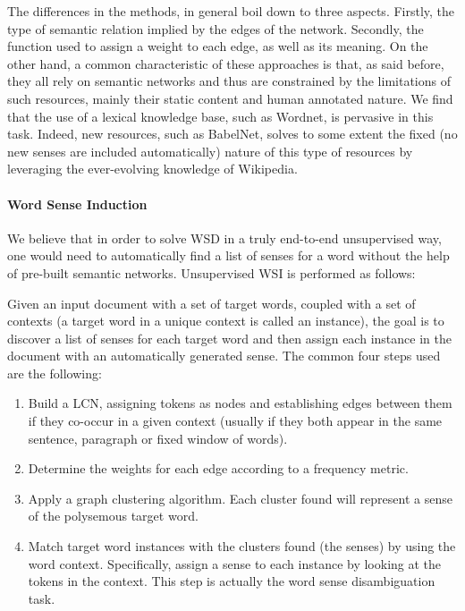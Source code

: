 The differences in the methods, in general boil down to three aspects. Firstly, the type of semantic relation implied by the edges of the network. Secondly, the function used to  assign a weight to each edge, as well as its meaning. On the other hand, a common characteristic of these approaches is that, as said before, they all rely on semantic networks and thus are constrained by the limitations of such resources, mainly their static content and human annotated nature. We find that the use of a lexical knowledge base, such as Wordnet, is pervasive in this task. Indeed, new resources, such as BabelNet, solves to some extent the fixed (no new senses are included automatically) nature of this type of resources by leveraging the ever-evolving knowledge of Wikipedia. 

\paragraph{Word Sense Induction}We believe that in order to solve WSD in a truly end-to-end unsupervised way, one would need to automatically find a list of senses for a word without the help of pre-built semantic networks. 
Unsupervised WSI is performed as follows:

Given an input document with a set of target words, coupled with a set of contexts (a target word in a unique context is called an instance), the goal is to discover a list of senses for each target word and then assign each instance in the document with an automatically generated sense. The common four steps used are the following:

\begin{enumerate}
\item Build a LCN, assigning tokens as nodes and  establishing edges between them if they co-occur in a given context (usually if they both appear in the same sentence, paragraph or fixed window of words).
\item Determine the weights for each edge according to a frequency metric. 
\item Apply a graph clustering algorithm. Each cluster found will represent a sense of the polysemous target word.
\item Match target word instances with the clusters found (the senses) by using the word context. Specifically, assign a sense to each instance by looking at the tokens in the context. This step is actually the word sense disambiguation task. 
\end{enumerate}	

